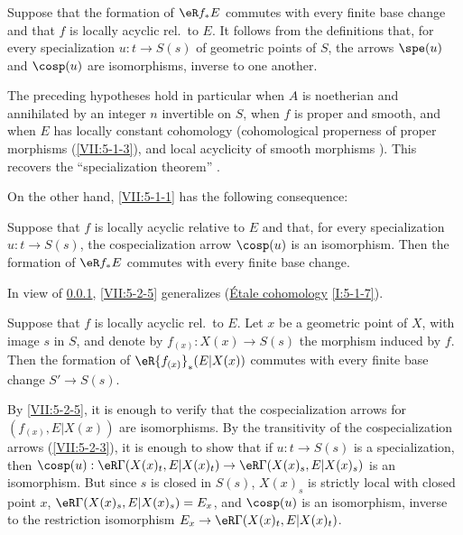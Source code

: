 \documentclass[oneside]{book}
\begin{document}
\subsubsection{}\label{VII:5-2-4}

Suppose that the formation of $\eR f_\ast E$ commutes with every finite base
change and that $f$ is locally acyclic rel.\ to $E$. It follows from the
definitions that, for every specialization $u:t\to S(s)$ of geometric points
of $S$, the arrows $\spe(u)$ and $\cosp(u)$ are isomorphisms, inverse to one
another.

The preceding hypotheses hold in particular when $A$ is noetherian and
annihilated by an integer $n$ invertible on $S$, when $f$ is proper and smooth,
and when $E$ has locally constant cohomology (cohomological properness of
proper morphisms (\ref{VII:5-1-3}), and local acyclicity of smooth morphisms
\cite[XV]{sga4}). This recovers the ``specialization theorem''
\cite[XVI 2.1]{sga4}.

On the other hand, \ref{VII:5-1-1} has the following consequence:






\begin{proposition}\label{VII:5-2-5}
Suppose that $f$ is locally acyclic relative to $E$ and that, for every
specialization $u:t\to S(s)$, the cospecialization arrow $\cosp(u)$ is an
isomorphism. Then the formation of $\eR f_\ast E$ commutes with every finite
base change.
\end{proposition}

In view of \ref{VII:5-2-4}, \ref{VII:5-2-5} generalizes
(\hyperref[I]{Étale cohomology} \ref{I:5-1-7}).






\begin{corollary}\label{VII:5-2-6}
Suppose that $f$ is locally acyclic rel.\ to $E$. Let $x$ be a geometric
point of $X$, with image $s$ in $S$, and denote by
$f_{(x)}:X(x)\to S(s)$ the morphism induced by $f$. Then the formation of
$\eR {f_{(x)}}_\ast(E|X(x))$ commutes with every finite base change
$S'\to S(s)$.
\end{corollary}

By \ref{VII:5-2-5}, it is enough to verify that the cospecialization arrows
for $(f_{(x)},E|X(x))$ are isomorphisms. By the transitivity of the
cospecialization arrows (\ref{VII:5-2-3}), it is enough to show that if
$u:t\to S(s)$ is a specialization, then
$\cosp(u):\eR\Gamma(X(x)_t,E|X(x)_t)\to \eR\Gamma(X(x)_s,E|X(x)_s)$ is an
isomorphism. But since $s$ is closed in $S(s)$, $X(x)_s$ is strictly local
with closed point $x$, $\eR\Gamma(X(x)_s,E|X(x)_s)=E_x$, and $\cosp(u)$ is an
isomorphism, inverse to the restriction isomorphism
$E_x\to \eR\Gamma(X(x)_t,E|X(x)_t)$.
\end{document}
